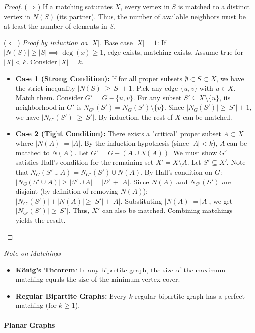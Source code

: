 \begin{proof}
($\Rightarrow$) If a matching saturates $X$, every vertex in $S$ is matched to a distinct vertex in $N(S)$ (its partner). Thus, the number of available neighbors must be at least the number of elements in $S$.

($\Leftarrow$) \textit{Proof by induction on $|X|$.}
Base case $|X|=1$: If $|N(S)| \ge |S| \implies \deg(x) \ge 1$, edge exists, matching exists.
Assume true for $|X| < k$. Consider $|X|=k$.
\begin{itemize}
    \item \textbf{Case 1 (Strong Condition):} If for all proper subsets $\emptyset \subset S \subset X$, we have the strict inequality $|N(S)| \ge |S| + 1$.
    Pick any edge $\{u, v\}$ with $u \in X$. Match them. Consider $G' = G - \{u, v\}$.
    For any subset $S' \subseteq X \setminus \{u\}$, its neighborhood in $G'$ is $N_{G'}(S') = N_G(S') \setminus \{v\}$.
    Since $|N_G(S')| \ge |S'| + 1$, we have $|N_{G'}(S')| \ge |S'|$.
    By induction, the rest of $X$ can be matched.

    \item \textbf{Case 2 (Tight Condition):} There exists a "critical" proper subset $A \subset X$ where $|N(A)| = |A|$.
    By the induction hypothesis (since $|A| < k$), $A$ can be matched to $N(A)$.
    Let $G' = G - (A \cup N(A))$. We must show $G'$ satisfies Hall's condition for the remaining set $X' = X \setminus A$.
    Let $S' \subseteq X'$. Note that $N_G(S' \cup A) = N_{G'}(S') \cup N(A)$.
    By Hall's condition on $G$: $|N_G(S' \cup A)| \ge |S' \cup A| = |S'| + |A|$.
    Since $N(A)$ and $N_{G'}(S')$ are disjoint (by definition of removing $N(A)$):
    $|N_{G'}(S')| + |N(A)| \ge |S'| + |A|$.
    Substituting $|N(A)| = |A|$, we get $|N_{G'}(S')| \ge |S'|$.
    Thus, $X'$ can also be matched. Combining matchings yields the result.
\end{itemize}
\end{proof}

\textit{Note on Matchings}
\begin{itemize}
    \item \textbf{König's Theorem:} In any bipartite graph, the size of the maximum matching equals the size of the minimum vertex cover.
    \item \textbf{Regular Bipartite Graphs:} Every $k$-regular bipartite graph has a perfect matching (for $k \geq 1$).
\end{itemize}

\paragraph{Planar Graphs}

